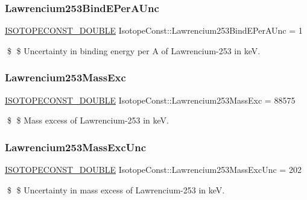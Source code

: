 \subsubsection{\texorpdfstring{Lawrencium253\+Bind\+E\+Per\+A\+Unc}{Lawrencium253BindEPerAUnc}}
{\footnotesize\ttfamily \mbox{\hyperlink{group___isotope_const-_macros_ga8f45a7272ce02c0b4c65c44636ed719a}{I\+S\+O\+T\+O\+P\+E\+C\+O\+N\+S\+T\+\_\+\+D\+O\+U\+B\+LE}} Isotope\+Const\+::\+Lawrencium253\+Bind\+E\+Per\+A\+Unc = 1}

\$ \$ Uncertainty in binding energy per A of Lawrencium-\/253 in keV. \mbox{\label{group___isotope_const-_lawrencium-_lr253_ga697ae19fc2cd4be966ef749eb2630ae0}} 
\subsubsection{\texorpdfstring{Lawrencium253\+Mass\+Exc}{Lawrencium253MassExc}}
{\footnotesize\ttfamily \mbox{\hyperlink{group___isotope_const-_macros_ga8f45a7272ce02c0b4c65c44636ed719a}{I\+S\+O\+T\+O\+P\+E\+C\+O\+N\+S\+T\+\_\+\+D\+O\+U\+B\+LE}} Isotope\+Const\+::\+Lawrencium253\+Mass\+Exc = 88575}

\$ \$ Mass excess of Lawrencium-\/253 in keV. \mbox{\label{group___isotope_const-_lawrencium-_lr253_ga2b04d0f4853e31b6727389675d4e47d9}} 
\subsubsection{\texorpdfstring{Lawrencium253\+Mass\+Exc\+Unc}{Lawrencium253MassExcUnc}}
{\footnotesize\ttfamily \mbox{\hyperlink{group___isotope_const-_macros_ga8f45a7272ce02c0b4c65c44636ed719a}{I\+S\+O\+T\+O\+P\+E\+C\+O\+N\+S\+T\+\_\+\+D\+O\+U\+B\+LE}} Isotope\+Const\+::\+Lawrencium253\+Mass\+Exc\+Unc = 202}

\$ \$ Uncertainty in mass excess of Lawrencium-\/253 in keV. \mbox{\label{group___isotope_const-_lawrencium-_lr253_ga976743f94e1436a5c440c9a54892891a}} 
